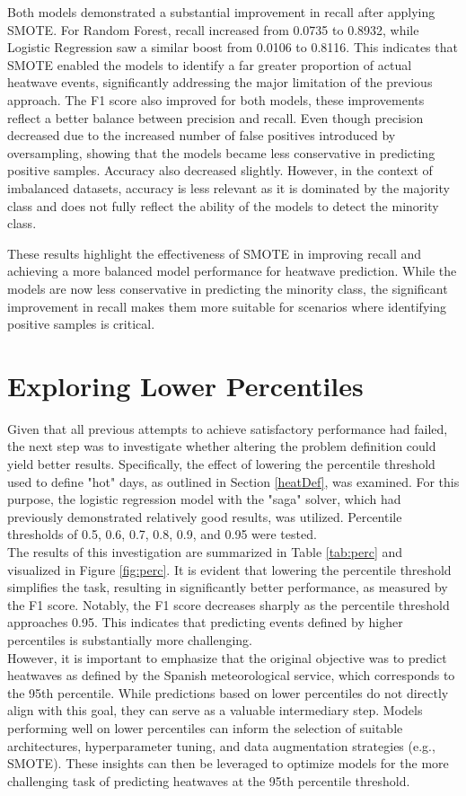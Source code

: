 \documentclass[conference,9pt]{IEEEtran}
\begin{document}
Both models demonstrated a substantial improvement in recall after applying SMOTE. For Random Forest, recall increased from 0.0735 to 0.8932, while Logistic Regression saw a similar boost from 0.0106 to 0.8116. This indicates that SMOTE enabled the models to identify a far greater proportion of actual heatwave events, significantly addressing the major limitation of the previous approach. The F1 score also improved for both models, these improvements reflect a better balance between precision and recall. Even though precision decreased due to the increased number of false positives introduced by oversampling, showing that the models became less conservative in predicting positive samples. Accuracy also decreased slightly. However, in the context of imbalanced datasets, accuracy is less relevant as it is dominated by the majority class and does not fully reflect the ability of the models to detect the minority class.

These results highlight the effectiveness of SMOTE in improving recall and achieving a more balanced model performance for heatwave prediction. While the models are now less conservative in predicting the minority class, the significant improvement in recall makes them more suitable for scenarios where identifying positive samples is critical.


\section{Exploring Lower Percentiles}
Given that all previous attempts to achieve satisfactory performance had failed, the next step was to investigate whether altering the problem definition could yield better results. Specifically, the effect of lowering the percentile threshold used to define "hot" days, as outlined in Section \ref{heatDef}, was examined. For this purpose, the logistic regression model with the "saga" solver, which had previously demonstrated relatively good results, was utilized. Percentile thresholds of 0.5, 0.6, 0.7, 0.8, 0.9, and 0.95 were tested.\\
The results of this investigation are summarized in Table \ref{tab:perc} and visualized in Figure \ref{fig:perc}. It is evident that lowering the percentile threshold simplifies the task, resulting in significantly better performance, as measured by the F1 score. Notably, the F1 score decreases sharply as the percentile threshold approaches 0.95. This indicates that predicting events defined by higher percentiles is substantially more challenging.\\
However, it is important to emphasize that the original objective was to predict heatwaves as defined by the Spanish meteorological service, which corresponds to the 95th percentile. While predictions based on lower percentiles do not directly align with this goal, they can serve as a valuable intermediary step. Models performing well on lower percentiles can inform the selection of suitable architectures, hyperparameter tuning, and data augmentation strategies (e.g., SMOTE). These insights can then be leveraged to optimize models for the more challenging task of predicting heatwaves at the 95th percentile threshold.
\end{document}
